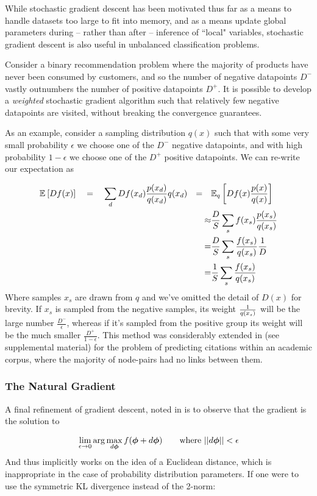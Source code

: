 While stochastic gradient descent has been motivated thus far as a means to handle datasets too large to fit into memory, and as a means update global parameters during  -- rather than after -- inference of ``local" variables, stochastic gradient descent is also useful in unbalanced classification problems.

Consider a binary recommendation problem where the majority of products have never been consumed by customers, and so the number of negative datapoints $D^-$ vastly outnumbers the number of positive datapoints $D^+$. It is possible to develop a \emph{weighted} stochastic gradient algorithm such that relatively few negative datapoints are visited, without breaking the convergence guarantees. 

As an example, consider a sampling distribution $q(x)$ such that with some very small probability $\epsilon$ we choose one of the $D^-$ negative datapoints, and with high probability $1 - \epsilon$ we choose one of the $D^+$ positive datapoints. We can re-write our expectation as

\begin{align*}
\ex{D f(x)}{} \quad
&= \quad \sum_d D f(x_d) \frac{p(x_d)}{q(x_d)} q(x_d) 
& = \quad & \ex{D f(x) \frac{p(x)}{q(x)}}{q} \\
& & \approx & \frac{D}{S} \sum_s f(x_s) \frac{p(x_s)}{q(x_s)} \\
& & = & \frac{D}{S} \sum_s \frac{f(x_s)}{q(x_s)} \frac{1}{D} \\
& & = & \frac{1}{S} \sum_s \frac{f(x_s)}{q(x_s)}
\end{align*}
Where samples $x_s$ are drawn from $q$ and we've omitted the detail of $D(x)$ for brevity. If $x_s$ is sampled from the negative samples, its weight $\oneover{q(x_s)}$ will be the large number $\frac{D^-}{\epsilon}$, whereas if it's sampled from the positive group its weight will be the much smaller $\frac{D^+}{1 - \epsilon}$. This method was considerably extended in \cite{Gopalan2013b} (see supplemental material) for the problem of predicting citations within an academic corpus, where the majority of node-pairs had no links between them.

\subsubsection*{The Natural Gradient}
A final refinement of gradient descent, noted in \cite{Hoffman2012} is to observe that the gradient is the solution to

\begin{align*}
\lim_{\epsilon \rightarrow 0} \arg \max_{d\param} f(\param + d\param) \qquad \text{where } ||d\param|| < \epsilon
\end{align*}
And thus implicitly works on the idea of a Euclidean distance, which is inappropriate in the case of probability distribution parameters. If one were to use the symmetric KL divergence instead of the 2-norm:

